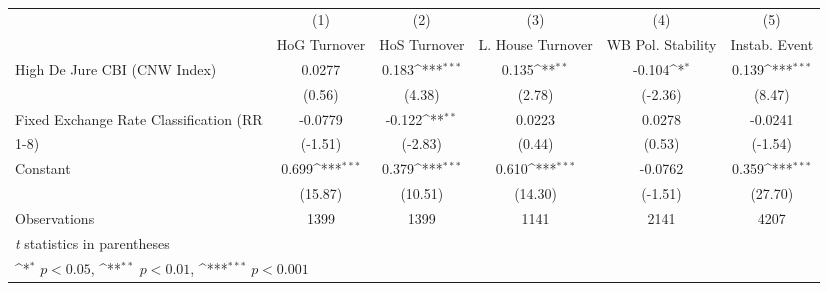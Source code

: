 \begin{table}[htbp]\centering
\def\sym#1{\ifmmode^{#1}\else\(^{#1}\)\fi}
\caption{\label{binaryIndOLSDJ}}
\begin{tabular}{l*{5}{c}}
\toprule
                                        &\multicolumn{1}{c}{(1)}&\multicolumn{1}{c}{(2)}&\multicolumn{1}{c}{(3)}&\multicolumn{1}{c}{(4)}&\multicolumn{1}{c}{(5)}\\
                                        &\multicolumn{1}{c}{HoG Turnover}&\multicolumn{1}{c}{HoS Turnover}&\multicolumn{1}{c}{L. House Turnover}&\multicolumn{1}{c}{WB Pol. Stability}&\multicolumn{1}{c}{Instab. Event}\\
\midrule
High De Jure CBI (CNW Index)            &   0.0277         &    0.183\sym{***}&    0.135\sym{**} &   -0.104\sym{*}  &    0.139\sym{***}\\
                                        &   (0.56)         &   (4.38)         &   (2.78)         &  (-2.36)         &   (8.47)         \\
\addlinespace
Fixed Exchange Rate Classification (RR  &  -0.0779         &   -0.122\sym{**} &   0.0223         &   0.0278         &  -0.0241         \\
1-8)                                    &  (-1.51)         &  (-2.83)         &   (0.44)         &   (0.53)         &  (-1.54)         \\
\addlinespace
Constant                                &    0.699\sym{***}&    0.379\sym{***}&    0.610\sym{***}&  -0.0762         &    0.359\sym{***}\\
                                        &  (15.87)         &  (10.51)         &  (14.30)         &  (-1.51)         &  (27.70)         \\
\midrule
Observations                            &     1399         &     1399         &     1141         &     2141         &     4207         \\
\bottomrule
\multicolumn{6}{l}{\footnotesize \textit{t} statistics in parentheses}\\
\multicolumn{6}{l}{\footnotesize \sym{*} \(p<0.05\), \sym{**} \(p<0.01\), \sym{***} \(p<0.001\)}\\
\end{tabular}
\end{table}
